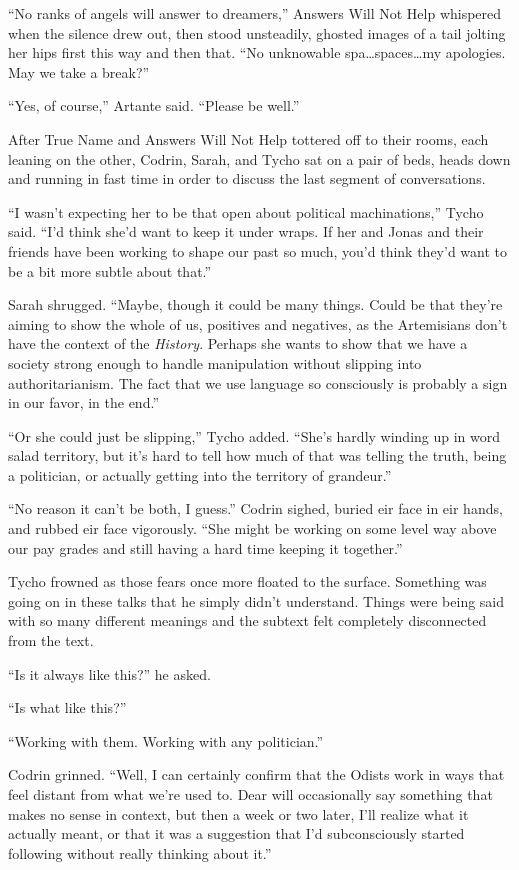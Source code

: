 ``No ranks of angels will answer to dreamers,'' Answers Will Not Help whispered when the silence drew out, then stood unsteadily, ghosted images of a tail jolting her hips first this way and then that. ``No unknowable spa\ldots spaces\ldots my apologies. May we take a break?''

``Yes, of course,'' Artante said. ``Please be well.''

After True Name and Answers Will Not Help tottered off to their rooms, each leaning on the other, Codrin, Sarah, and Tycho sat on a pair of beds, heads down and running in fast time in order to discuss the last segment of conversations.

``I wasn't expecting her to be that open about political machinations,'' Tycho said. ``I'd think she'd want to keep it under wraps. If her and Jonas and their friends have been working to shape our past so much, you'd think they'd want to be a bit more subtle about that.''

Sarah shrugged. ``Maybe, though it could be many things. Could be that they're aiming to show the whole of us, positives and negatives, as the Artemisians don't have the context of the \emph{History}. Perhaps she wants to show that we have a society strong enough to handle manipulation without slipping into authoritarianism. The fact that we use language so consciously is probably a sign in our favor, in the end.''

``Or she could just be slipping,'' Tycho added. ``She's hardly winding up in word salad territory, but it's hard to tell how much of that was telling the truth, being a politician, or actually getting into the territory of grandeur.''

``No reason it can't be both, I guess.'' Codrin sighed, buried eir face in eir hands, and rubbed eir face vigorously. ``She might be working on some level way above our pay grades and still having a hard time keeping it together.''

Tycho frowned as those fears once more floated to the surface. Something was going on in these talks that he simply didn't understand. Things were being said with so many different meanings and the subtext felt completely disconnected from the text.

``Is it always like this?'' he asked.

``Is what like this?''

``Working with them. Working with any politician.''

Codrin grinned. ``Well, I can certainly confirm that the Odists work in ways that feel distant from what we're used to. Dear will occasionally say something that makes no sense in context, but then a week or two later, I'll realize what it actually meant, or that it was a suggestion that I'd subconsciously started following without really thinking about it.''

